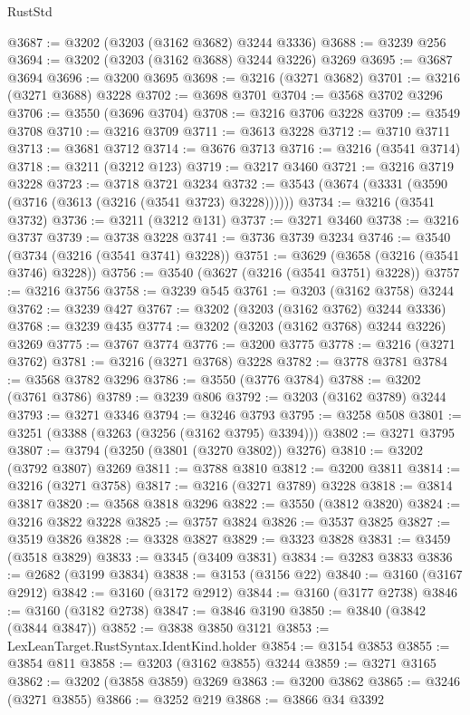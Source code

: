 \begin{lexlean}{RustStd}
\begin{coremodule}
@3687 := @3202 (@3203 (@3162 @3682) @3244 @3336)
@3688 := @3239 @256
@3694 := @3202 (@3203 (@3162 @3688) @3244 @3226) @3269
@3695 := @3687 @3694
@3696 := @3200 @3695
@3698 := @3216 (@3271 @3682)
@3701 := @3216 (@3271 @3688) @3228
@3702 := @3698 @3701
@3704 := @3568 @3702 @3296
@3706 := @3550 (@3696 @3704)
@3708 := @3216 @3706 @3228
@3709 := @3549 @3708
@3710 := @3216 @3709
@3711 := @3613 @3228
@3712 := @3710 @3711
@3713 := @3681 @3712
@3714 := @3676 @3713
@3716 := @3216 (@3541 @3714)
@3718 := @3211 (@3212 @123)
@3719 := @3217 @3460
@3721 := @3216 @3719 @3228
@3723 := @3718 @3721 @3234
@3732 := @3543 (@3674 (@3331 (@3590 (@3716 (@3613 (@3216 (@3541 @3723) @3228))))))
@3734 := @3216 (@3541 @3732)
@3736 := @3211 (@3212 @131)
@3737 := @3271 @3460
@3738 := @3216 @3737
@3739 := @3738 @3228
@3741 := @3736 @3739 @3234
@3746 := @3540 (@3734 (@3216 (@3541 @3741) @3228))
@3751 := @3629 (@3658 (@3216 (@3541 @3746) @3228))
@3756 := @3540 (@3627 (@3216 (@3541 @3751) @3228))
@3757 := @3216 @3756
@3758 := @3239 @545
@3761 := @3203 (@3162 @3758) @3244
@3762 := @3239 @427
@3767 := @3202 (@3203 (@3162 @3762) @3244 @3336)
@3768 := @3239 @435
@3774 := @3202 (@3203 (@3162 @3768) @3244 @3226) @3269
@3775 := @3767 @3774
@3776 := @3200 @3775
@3778 := @3216 (@3271 @3762)
@3781 := @3216 (@3271 @3768) @3228
@3782 := @3778 @3781
@3784 := @3568 @3782 @3296
@3786 := @3550 (@3776 @3784)
@3788 := @3202 (@3761 @3786)
@3789 := @3239 @806
@3792 := @3203 (@3162 @3789) @3244
@3793 := @3271 @3346
@3794 := @3246 @3793
@3795 := @3258 @508
@3801 := @3251 (@3388 (@3263 (@3256 (@3162 @3795) @3394)))
@3802 := @3271 @3795
@3807 := @3794 (@3250 (@3801 (@3270 @3802)) @3276)
@3810 := @3202 (@3792 @3807) @3269
@3811 := @3788 @3810
@3812 := @3200 @3811
@3814 := @3216 (@3271 @3758)
@3817 := @3216 (@3271 @3789) @3228
@3818 := @3814 @3817
@3820 := @3568 @3818 @3296
@3822 := @3550 (@3812 @3820)
@3824 := @3216 @3822 @3228
@3825 := @3757 @3824
@3826 := @3537 @3825
@3827 := @3519 @3826
@3828 := @3328 @3827
@3829 := @3323 @3828
@3831 := @3459 (@3518 @3829)
@3833 := @3345 (@3409 @3831)
@3834 := @3283 @3833
@3836 := @2682 (@3199 @3834)
@3838 := @3153 (@3156 @22)
@3840 := @3160 (@3167 @2912)
@3842 := @3160 (@3172 @2912)
@3844 := @3160 (@3177 @2738)
@3846 := @3160 (@3182 @2738)
@3847 := @3846 @3190
@3850 := @3840 (@3842 (@3844 @3847))
@3852 := @3838 @3850 @3121
@3853 := LexLeanTarget.RustSyntax.IdentKind.holder
@3854 := @3154 @3853
@3855 := @3854 @811
@3858 := @3203 (@3162 @3855) @3244
@3859 := @3271 @3165
@3862 := @3202 (@3858 @3859) @3269
@3863 := @3200 @3862
@3865 := @3246 (@3271 @3855)
@3866 := @3252 @219
@3868 := @3866 @34 @3392

\end{coremodule}
\end{lexlean}

